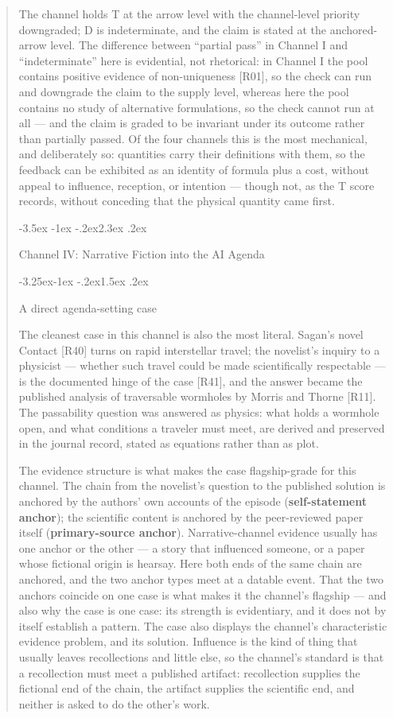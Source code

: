 \documentclass[11pt,a4paper]{article}
\makeatletter
\renewcommand\section{\@startsection{section}{1}{\z@}%
  {-3.5ex \@plus -1ex \@minus -.2ex}{2.3ex \@plus .2ex}%
  {\normalfont\Large\bfseries\raggedright}}
\renewcommand\subsection{\@startsection{subsection}{2}{\z@}%
  {-3.25ex\@plus -1ex \@minus -.2ex}{1.5ex \@plus .2ex}%
  {\normalfont\large\bfseries\raggedright}}
\makeatother
\begin{document}
\begin{abstract}
The channel holds T at the arrow level with the channel-level priority downgraded; D is indeterminate, and the claim is stated at the anchored-arrow level. The difference between ``partial pass'' in Channel I and ``indeterminate'' here is evidential, not rhetorical: in Channel I the pool contains positive evidence of non-uniqueness [R01], so the check can run and downgrade the claim to the supply level, whereas here the pool contains no study of alternative formulations, so the check cannot run at all — and the claim is graded to be invariant under its outcome rather than partially passed. Of the four channels this is the most mechanical, and deliberately so: quantities carry their definitions with them, so the feedback can be exhibited as an identity of formula plus a cost, without appeal to influence, reception, or intention — though not, as the T score records, without conceding that the physical quantity came first.

\section{Channel IV: Narrative Fiction into the AI Agenda}

\subsection{A direct agenda-setting case}

The cleanest case in this channel is also the most literal. Sagan's novel Contact [R40] turns on rapid interstellar travel; the novelist's inquiry to a physicist — whether such travel could be made scientifically respectable — is the documented hinge of the case [R41], and the answer became the published analysis of traversable wormholes by Morris and Thorne [R11]. The passability question was answered as physics: what holds a wormhole open, and what conditions a traveler must meet, are derived and preserved in the journal record, stated as equations rather than as plot.

The evidence structure is what makes the case flagship-grade for this channel. The chain from the novelist's question to the published solution is anchored by the authors' own accounts of the episode (\textbf{self-statement anchor}); the scientific content is anchored by the peer-reviewed paper itself (\textbf{primary-source anchor}). Narrative-channel evidence usually has one anchor or the other — a story that influenced someone, or a paper whose fictional origin is hearsay. Here both ends of the same chain are anchored, and the two anchor types meet at a datable event. That the two anchors coincide on one case is what makes it the channel's flagship — and also why the case is one case: its strength is evidentiary, and it does not by itself establish a pattern. The case also displays the channel's characteristic evidence problem, and its solution. Influence is the kind of thing that usually leaves recollections and little else, so the channel's standard is that a recollection must meet a published artifact: recollection supplies the fictional end of the chain, the artifact supplies the scientific end, and neither is asked to do the other's work.


\end{abstract}
\end{document}

